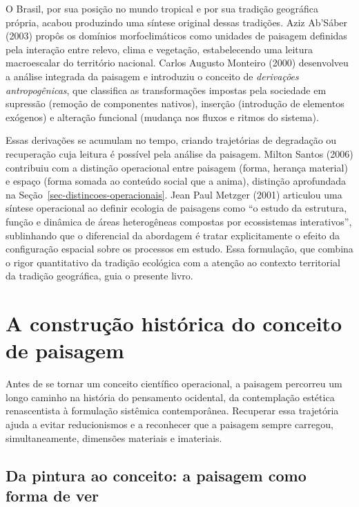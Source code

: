 \documentclass[
  portuguese,
  11pt,
  a4paper,
  open=any]{scrbook}
\begin{document}
O Brasil, por sua posição no mundo tropical e por sua tradição
geográfica própria, acabou produzindo uma síntese original dessas
tradições. Aziz Ab'Sáber (2003) propôs os domínios morfoclimáticos como
unidades de paisagem definidas pela interação entre relevo, clima e
vegetação, estabelecendo uma leitura macroescalar do território
nacional. Carlos Augusto Monteiro (2000) desenvolveu a análise integrada
da paisagem e introduziu o conceito de \emph{derivações antropogênicas},
que classifica as transformações impostas pela sociedade em supressão
(remoção de componentes nativos), inserção (introdução de elementos
exógenos) e alteração funcional (mudança nos fluxos e ritmos do
sistema).

Essas derivações se acumulam no tempo, criando trajetórias de degradação
ou recuperação cuja leitura é possível pela análise da paisagem. Milton
Santos (2006) contribuiu com a distinção operacional entre paisagem
(forma, herança material) e espaço (forma somada ao conteúdo social que
a anima), distinção aprofundada na
Seção~\ref{sec-distincoes-operacionais}. Jean Paul Metzger (2001)
articulou uma síntese operacional ao definir ecologia de paisagens como
``o estudo da estrutura, função e dinâmica de áreas heterogêneas
compostas por ecossistemas interativos'', sublinhando que o diferencial
da abordagem é tratar explicitamente o efeito da configuração espacial
sobre os processos em estudo. Essa formulação, que combina o rigor
quantitativo da tradição ecológica com a atenção ao contexto territorial
da tradição geográfica, guia o presente livro.

\section{A construção histórica do conceito de
paisagem}\label{a-construuxe7uxe3o-histuxf3rica-do-conceito-de-paisagem}

Antes de se tornar um conceito científico operacional, a paisagem
percorreu um longo caminho na história do pensamento ocidental, da
contemplação estética renascentista à formulação sistêmica
contemporânea. Recuperar essa trajetória ajuda a evitar reducionismos e
a reconhecer que a paisagem sempre carregou, simultaneamente, dimensões
materiais e imateriais.

\subsection{Da pintura ao conceito: a paisagem como forma de
ver}\label{da-pintura-ao-conceito-a-paisagem-como-forma-de-ver}
\end{document}
